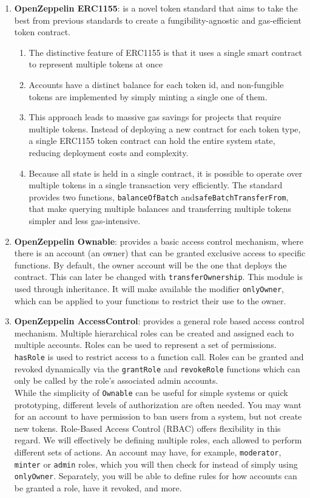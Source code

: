 \begin{enumerate}
\item\textbf{OpenZeppelin ERC1155}: is a novel token standard that aims to take the best from previous standards to create a fungibility-agnostic and gas-efficient token contract.
	\begin{enumerate}
	\item The distinctive feature of ERC1155 is that it uses a single smart contract to represent multiple tokens at once
	\item Accounts have a distinct balance for each token id, and non-fungible tokens are implemented by simply minting a single one of them.
	\item This approach leads to massive gas savings for projects that require multiple tokens. Instead of deploying a new contract for each token type, a single ERC1155 token contract can hold the entire system state, reducing deployment costs and complexity.
	\item Because all state is held in a single contract, it is possible to operate over multiple tokens in a single transaction very efficiently. The standard provides two functions, \verb|balanceOfBatch| and\linebreak\verb|safeBatchTransferFrom|, that make querying multiple balances and transferring multiple tokens simpler and less gas-intensive.
	\end{enumerate}

\item\textbf{OpenZeppelin Ownable}: provides a basic access control mechanism, where there is an account (an owner) that can be granted exclusive access to specific functions. By default, the owner account will be the one that deploys the contract. This can later be changed with \verb|transferOwnership|. This module is used through inheritance. It will make available the modifier \verb|onlyOwner|, which can be applied to your functions to restrict their use to the owner.

\item\textbf{OpenZeppelin AccessControl}: provides a general role based access control mechanism. Multiple hierarchical roles can be created and assigned each to multiple accounts. Roles can be used to represent a set of permissions. \verb|hasRole| is used to restrict access to a function call. Roles can be granted and revoked dynamically via the \verb|grantRole| and \verb|revokeRole| functions which can only be called by the role’s associated admin accounts.\\

While the simplicity of \verb|Ownable| can be useful for simple systems or quick prototyping, different levels of authorization are often needed. You may want for an account to have permission to ban users from a system, but not create new tokens. Role-Based Access Control (RBAC) offers flexibility in this regard. We will effectively be defining multiple roles, each allowed to perform different sets of actions. An account may have, for example, \verb|moderator|, \verb|minter| or \verb|admin| roles, which you will then check for instead of simply using \verb|onlyOwner|. Separately, you will be able to define rules for how accounts can be granted a role, have it revoked, and more.\\


\end{enumerate}
